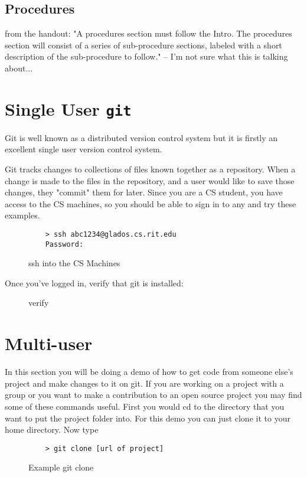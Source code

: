 \documentclass[11pt]{report}
\begin{document}
\section{Procedures}
from the handout: "A procedures section must follow the Intro. The
procedures section will consist of a series of sub-procedure sections,
labeled with a short description of the sub-procedure to follow." --
I'm not sure what this is talking about...

\chapter{Single User \texttt{git}}
Git is well known as a distributed version control system but it is
firstly an excellent single user version control system.

Git tracks changes to collections of files known together as a repository.
When a change is made to the files in the repository, and a user would like
to save those changes, they "commit" them for later. Since you are a CS student,
you have access to the CS machines, so you should be able to sign in to any and
try these examples.

\begin{figure}[H]
  \caption{ssh into the CS Machines}
  \begin{lstlisting}
    > ssh abc1234@glados.cs.rit.edu
    Password:
  \end{lstlisting}
\end{figure}

Once you've logged in, verify that git is installed:
\begin{figure}[H]
  \caption{verify}
  
\end{figure}




\chapter{Multi-user}
In this section you will be doing a demo of how to get code from
someone else's project and make changes to it on git. If you are
working on a project with a group or you want to make a contribution
to an open source project you may find some of these commands useful.
First you would cd to the directory that you want to put the project
folder into.  For this demo you can just clone it to your home
directory.  Now type
\begin{figure}[H]
  \caption{Example git clone}
  \begin{lstlisting}
    > git clone [url of project]
  \end{lstlisting}
\end{figure}
\end{document}
